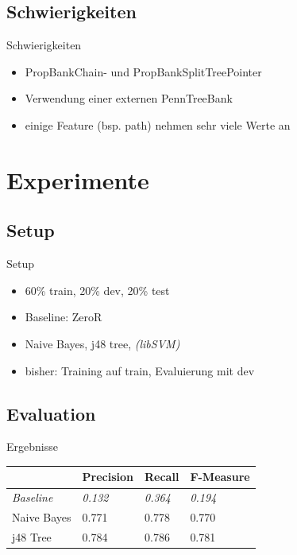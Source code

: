 \documentclass[10pt]{beamer}
\begin{document}
\subsection{Schwierigkeiten}
\begin{frame}{Schwierigkeiten}
	\begin{itemize}
		\item PropBankChain- und PropBankSplitTreePointer
		\item Verwendung einer externen PennTreeBank
		\item einige Feature (bsp. path) nehmen sehr viele Werte an
	\end{itemize}
\end{frame}

\section{Experimente}
\subsection{Setup}
\begin{frame}{Setup}

\begin{itemize}
	\item 60\% train, 20\% dev, 20\% test
	\item Baseline: ZeroR
	\item Naive Bayes, j48 tree, \textit{(libSVM)} 
	\item bisher: Training auf train, Evaluierung mit dev
\end{itemize}

\end{frame}

\subsection{Evaluation}

\begin{frame}{Ergebnisse}
\begin{table}[h]
\begin{tabular}{l|lll}
                  & Precision      & Recall         & F-Measure      \\ \hline
\textit{Baseline} & \textit{0.132} & \textit{0.364} & \textit{0.194} \\ \hline
Naive Bayes       & 0.771          & 0.778          & 0.770          \\
j48 Tree          & 0.784      	   & 0.786             & 0.781            
\end{tabular}
\end{table}
\end{frame}
\end{document}
